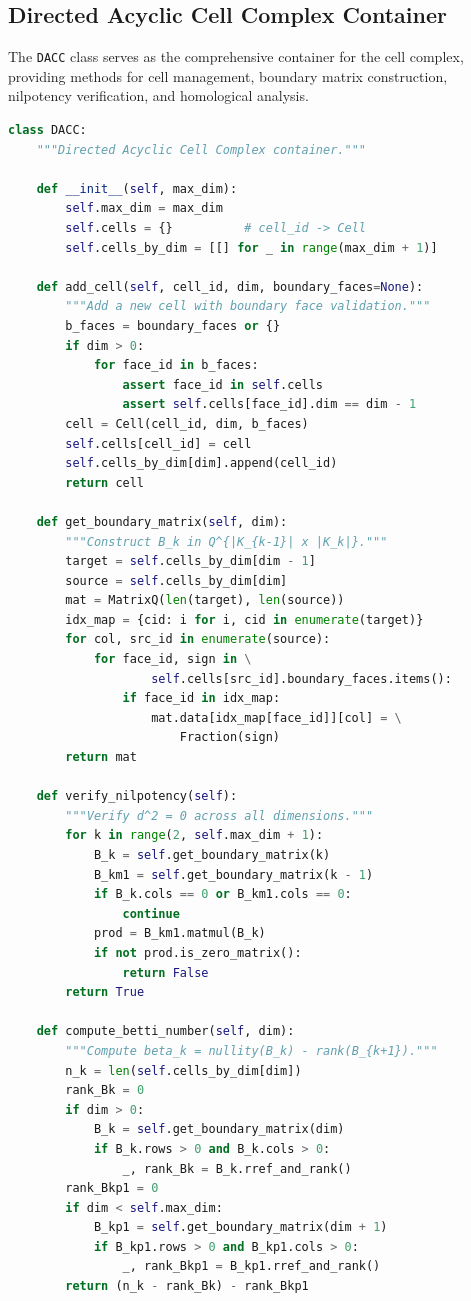 \documentclass[manuscript, nonacm, review=false]{acmart}
\theoremstyle{definition}
\theoremstyle{plain}
\begin{document}
\subsection{Directed Acyclic Cell Complex Container}
\label{subsec:ref_dacc}

The \texttt{DACC} class serves as the comprehensive container for the cell complex, providing methods for cell management, boundary matrix construction, nilpotency verification, and homological analysis.

\begin{lstlisting}[language=Python, caption={DACC class: Core topological container (key methods)}, label={lst:dacc}]
class DACC:
    """Directed Acyclic Cell Complex container."""
    
    def __init__(self, max_dim):
        self.max_dim = max_dim
        self.cells = {}          # cell_id -> Cell
        self.cells_by_dim = [[] for _ in range(max_dim + 1)]
    
    def add_cell(self, cell_id, dim, boundary_faces=None):
        """Add a new cell with boundary face validation."""
        b_faces = boundary_faces or {}
        if dim > 0:
            for face_id in b_faces:
                assert face_id in self.cells
                assert self.cells[face_id].dim == dim - 1
        cell = Cell(cell_id, dim, b_faces)
        self.cells[cell_id] = cell
        self.cells_by_dim[dim].append(cell_id)
        return cell
    
    def get_boundary_matrix(self, dim):
        """Construct B_k in Q^{|K_{k-1}| x |K_k|}."""
        target = self.cells_by_dim[dim - 1]
        source = self.cells_by_dim[dim]
        mat = MatrixQ(len(target), len(source))
        idx_map = {cid: i for i, cid in enumerate(target)}
        for col, src_id in enumerate(source):
            for face_id, sign in \
                    self.cells[src_id].boundary_faces.items():
                if face_id in idx_map:
                    mat.data[idx_map[face_id]][col] = \
                        Fraction(sign)
        return mat
    
    def verify_nilpotency(self):
        """Verify d^2 = 0 across all dimensions."""
        for k in range(2, self.max_dim + 1):
            B_k = self.get_boundary_matrix(k)
            B_km1 = self.get_boundary_matrix(k - 1)
            if B_k.cols == 0 or B_km1.cols == 0:
                continue
            prod = B_km1.matmul(B_k)
            if not prod.is_zero_matrix():
                return False
        return True
    
    def compute_betti_number(self, dim):
        """Compute beta_k = nullity(B_k) - rank(B_{k+1})."""
        n_k = len(self.cells_by_dim[dim])
        rank_Bk = 0
        if dim > 0:
            B_k = self.get_boundary_matrix(dim)
            if B_k.rows > 0 and B_k.cols > 0:
                _, rank_Bk = B_k.rref_and_rank()
        rank_Bkp1 = 0
        if dim < self.max_dim:
            B_kp1 = self.get_boundary_matrix(dim + 1)
            if B_kp1.rows > 0 and B_kp1.cols > 0:
                _, rank_Bkp1 = B_kp1.rref_and_rank()
        return (n_k - rank_Bk) - rank_Bkp1
\end{lstlisting}
\end{document}
